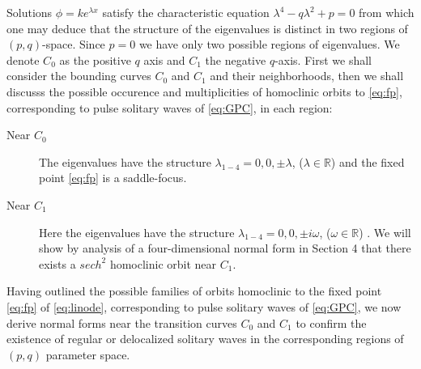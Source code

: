Solutions $\phi = k e^{\lambda x}$ satisfy the characteristic equation
$\lambda^4 - q \lambda^2 + p = 0 $ from which one may deduce that the structure
of the eigenvalues is distinct in two regions of $\left(p,q\right)$-space.
Since $p=0$ we have only two possible regions of eigenvalues.  We denote $C_0$
as the positive $q$ axis and $C_1$ the negative $q$-axis. First we shall 
consider the bounding curves $C_0$ and $C_1$ and their neighborhoods, then we shall discusss the possible
occurence and multiplicities of homoclinic orbits to \eqref{eq:fp}, corresponding
to pulse solitary waves of \eqref{eq:GPC}, in each region:

\begin{description}
\item[Near $C_0$] 
The eigenvalues have the structure $\lambda_{1-4} = 0,0,\pm \lambda$, ($\lambda \in \mathbb{R}$) and the fixed point
\eqref{eq:fp} is a saddle-focus.
\item[Near $C_1$] 
Here the eigenvalues have the structure $\lambda_{1-4} = 0,0,\pm i \omega $, ($\omega \in \mathbb{R} $) . We will show by analysis of a
four-dimensional normal form in Section 4 that there exists a $sech^2$ homoclinic orbit near $C_1$.
\end{description}

Having outlined the possible families of orbits homoclinic to the fixed point \eqref{eq:fp} of \eqref{eq:linode},
corresponding to pulse solitary waves of \eqref{eq:GPC}, we now derive normal forms near the transition curves $C_0$ and $C_1$
to confirm the existence of regular or delocalized solitary waves in the corresponding regions of $\left(p,q\right)$ parameter space.

